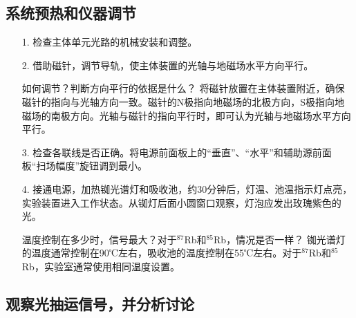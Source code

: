 

\clearpage
{}
\subsection{系统预热和仪器调节}
\begin{itemize}
    \item[1.] 检查主体单元光路的机械安装和调整。
    
    \item[2.] 借助磁针，调节导轨，使主体装置的光轴与地磁场水平方向平行。
    
    \begin{ubox}
        {如何调节？判断方向平行的依据是什么？}
        将磁针放置在主体装置附近，确保磁针的指向与光轴方向一致。磁针的N极指向地磁场的北极方向，S极指向地磁场的南极方向。光轴与磁针的指向平行时，即可认为光轴与地磁场水平方向平行。
    \end{ubox}
   
    
    \item[3.] 检查各联线是否正确。将电源前面板上的“垂直”、“水平”和辅助源前面板“扫场幅度”旋钮调到最小。
    \item[4.] 接通电源，加热铷光谱灯和吸收池，约30分钟后，灯温、池温指示灯点亮，实验装置进入工作状态。从铷灯后面小圆窗口观察，灯泡应发出玫瑰紫色的光。
    \begin{ubox}
        {温度控制在多少时，信号最大？对于$^{87}$Rb和$^{85}$Rb，情况是否一样？}
        铷光谱灯的温度通常控制在90℃左右，吸收池的温度控制在55℃左右。对于$^{87}$Rb和$^{85}$Rb，实验室通常使用相同温度设置。
    \end{ubox}

\end{itemize}

\subsection{观察光抽运信号，并分析讨论}

